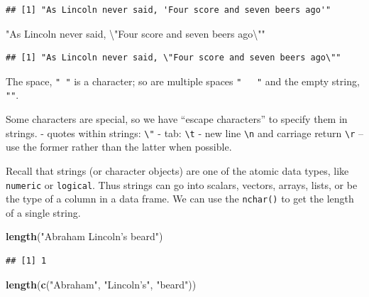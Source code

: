 \documentclass[
]{book}
\newenvironment{Shaded}{\begin{snugshade}}{\end{snugshade}}
\newcommand{\CharTok}[1]{\textcolor[rgb]{0.31,0.60,0.02}{#1}}
\newcommand{\KeywordTok}[1]{\textcolor[rgb]{0.13,0.29,0.53}{\textbf{#1}}}
\newcommand{\NormalTok}[1]{#1}
\newcommand{\StringTok}[1]{\textcolor[rgb]{0.31,0.60,0.02}{#1}}
\begin{document}
\begin{verbatim}
## [1] "As Lincoln never said, 'Four score and seven beers ago'"
\end{verbatim}

\begin{Shaded}
\begin{Highlighting}[]
\StringTok{"As Lincoln never said, }\CharTok{\textbackslash{}"}\StringTok{Four score and seven beers ago}\CharTok{\textbackslash{}"}\StringTok{"}
\end{Highlighting}
\end{Shaded}

\begin{verbatim}
## [1] "As Lincoln never said, \"Four score and seven beers ago\""
\end{verbatim}

The space, \texttt{"\ "} is a character; so are multiple spaces \texttt{"\ \ \ "} and the empty string, \texttt{""}.

Some characters are special, so we have ``escape characters'' to specify them in strings.
- quotes within strings: \texttt{\textbackslash{}"}
- tab: \texttt{\textbackslash{}t}
- new line \texttt{\textbackslash{}n} and carriage return \texttt{\textbackslash{}r} -- use the former rather than the latter when possible.

Recall that strings (or character objects) are one of the atomic data types, like \texttt{numeric} or \texttt{logical}. Thus strings can go into scalars, vectors, arrays, lists, or be the type of a column in a data frame. We can use the \texttt{nchar()} to get the length of a single string.

\begin{Shaded}
\begin{Highlighting}[]
\KeywordTok{length}\NormalTok{(}\StringTok{"Abraham Lincoln's beard"}\NormalTok{)}
\end{Highlighting}
\end{Shaded}

\begin{verbatim}
## [1] 1
\end{verbatim}

\begin{Shaded}
\begin{Highlighting}[]
\KeywordTok{length}\NormalTok{(}\KeywordTok{c}\NormalTok{(}\StringTok{"Abraham"}\NormalTok{, }\StringTok{"Lincoln's"}\NormalTok{,}
    \StringTok{"beard"}\NormalTok{))}
\end{Highlighting}
\end{Shaded}
\end{document}
